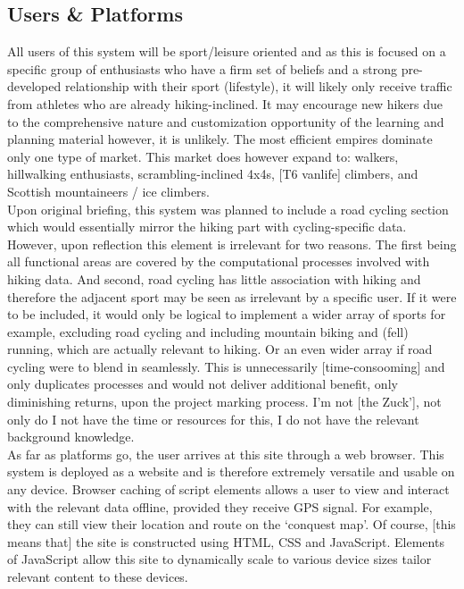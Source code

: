 \documentclass[11pt, english]{article}
\begin{document}
	\subsection{Users \& Platforms}

	All users of this system will be sport/leisure oriented and as this is focused on a specific group of enthusiasts who have a firm set of beliefs and a strong pre-developed relationship with their sport (lifestyle), it will likely only receive traffic from athletes who are already hiking-inclined. It may encourage new hikers due to the comprehensive nature and customization opportunity of the learning and planning material however, it is unlikely. The most efficient empires dominate only one type of market. This market does however expand to: walkers, hillwalking enthusiasts, scrambling-inclined 4x4s, [T6 vanlife] climbers, and Scottish mountaineers / ice climbers.\\

	Upon original briefing, this system was planned to include a road cycling section which would essentially mirror the hiking part with cycling-specific data. However, upon reflection this element is irrelevant for two reasons. The first being all functional areas are covered by the computational processes involved with hiking data. And second, road cycling has little association with hiking and therefore the adjacent sport may be seen as irrelevant by a specific user. If it were to be included, it would only be logical to implement a wider array of sports for example, excluding road cycling and including mountain biking and (fell) running, which are actually relevant to hiking. Or an even wider array if road cycling were to blend in seamlessly. This is unnecessarily [time-consooming] and only duplicates processes and would not deliver additional benefit, only diminishing returns, upon the project marking process. I'm not [the Zuck'], not only do I not have the time or resources for this, I do not have the relevant background knowledge.\\

	As far as platforms go, the user arrives at this site through a web browser. This system is deployed as a website and is therefore extremely versatile and usable on any device. Browser caching of script elements allows a user to view and interact with the relevant data offline, provided they receive GPS signal. For example, they can still view their location and route on the `conquest map'. Of course, [this means that] the site is constructed using HTML, CSS and JavaScript. Elements of JavaScript allow this site to dynamically scale to various device sizes tailor relevant content to these devices.
\end{document}
